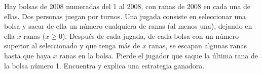 Hay bolsas de 2008 numeradas del 1 al 2008, con ranas de 2008 en cada una de ellas. Dos personas juegan por turnos. Una jugada consiste en seleccionar una bolsa y sacar de ella un número cualquiera de ranas (al menos una), dejando en ella $ x$ ranas ($ x\geq 0$). Después de cada jugada, de cada bolsa con un número superior al seleccionado y que tenga más de $ x$ ranas, se escapan algunas ranas hasta que haya $ x$ ranas en la bolsa. Pierde el jugador que saque la última rana de la bolsa número 1. Encuentra y explica una estrategia ganadora.
